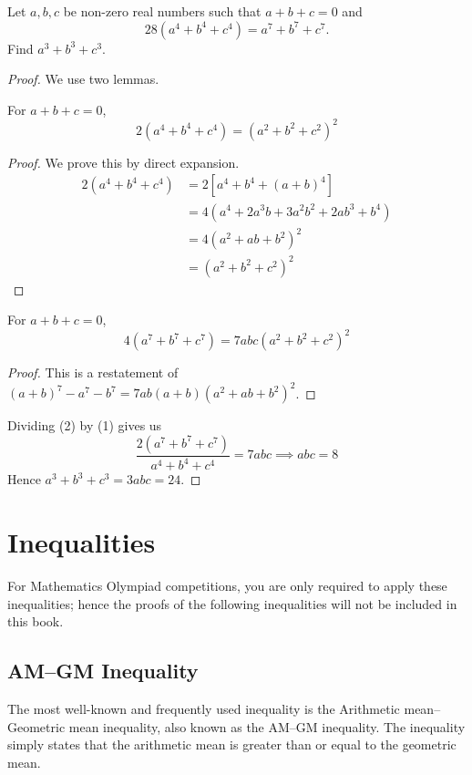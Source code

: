 \begin{prbm}
Let $a,b,c$ be non-zero real numbers such that $a+b+c=0$ and
\[ 28(a^4+b^4+c^4)=a^7+b^7+c^7. \]
Find $a^3+b^3+c^3$.
\end{prbm}
\begin{proof}
We use two lemmas.

\begin{lemma}
For $a+b+c=0$, 
\begin{equation*}\tag{1}
2(a^4+b^4+c^4)=(a^2+b^2+c^2)^2
\end{equation*}
\end{lemma}
\begin{proof}
We prove this by direct expansion.
\begin{align*}
2(a^4+b^4+c^4) &= 2[a^4+b^4+(a+b)^4] \\
&= 4(a^4+2a^3b+3a^2b^2+2ab^3+b^4) \\
&= 4(a^2+ab+b^2)^2 \\
&= (a^2+b^2+c^2)^2
\end{align*}
\end{proof}

\begin{lemma}
For $a+b+c=0$,
\begin{equation*}
4(a^7+b^7+c^7)=7abc(a^2+b^2+c^2)^2
\end{equation*}
\end{lemma}
\begin{proof}
This is a restatement of $(a+b)^7-a^7-b^7=7ab(a+b)(a^2+ab+b^2)^2$.
\end{proof}

Dividing (2) by (1) gives us
\[ \frac{2(a^7+b^7+c^7)}{a^4+b^4+c^4}=7abc \implies abc=8 \]
Hence $a^3+b^3+c^3=3abc=\boxed{24}$.
\end{proof}

\chapter{Inequalities}
For Mathematics Olympiad competitions, you are only required to apply these inequalities; hence the proofs of the following inequalities will not be included in this book.

\section{AM--GM Inequality}
The most well-known and frequently used inequality is the Arithmetic mean--Geometric mean inequality, also known as the AM--GM inequality. The inequality simply states that the arithmetic mean is greater than or equal to the geometric mean.

